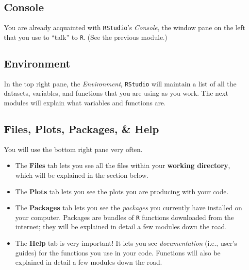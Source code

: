 \documentclass[
]{book}
\providecommand{\tightlist}{%
  \setlength{\itemsep}{0pt}\setlength{\parskip}{0pt}}
\begin{document}
\hypertarget{console}{%
\subsection*{Console}\label{console}}

You are already acquainted with \texttt{RStudio}'s \emph{Console}, the window pane on the left that you use to ``talk'' to \texttt{R}. (See the previous module.)

\hypertarget{environment}{%
\subsection*{Environment}\label{environment}}

In the top right pane, the \emph{Environment}, \texttt{RStudio} will maintain a list of all the datasets, variables, and functions that you are using as you work. The next modules will explain what variables and functions are.

\hypertarget{files-plots-packages-help}{%
\subsection*{Files, Plots, Packages, \& Help}\label{files-plots-packages-help}}

You will use the bottom right pane very often.

\begin{itemize}
\tightlist
\item
  The \textbf{Files} tab lets you see all the files within your \textbf{working directory}, which will be explained in the section below.\\
\item
  The \textbf{Plots} tab lets you see the plots you are producing with your code.\\
\item
  The \textbf{Packages} tab lets you see the \emph{packages} you currently have installed on your computer. Packages are bundles of \texttt{R} functions downloaded from the internet; they will be explained in detail a few modules down the road.\\
\item
  The \textbf{Help} tab is very important! It lets you see \emph{documentation} (i.e., user's guides) for the functions you use in your code. Functions will also be explained in detail a few modules down the road.
\end{itemize}
\end{document}
